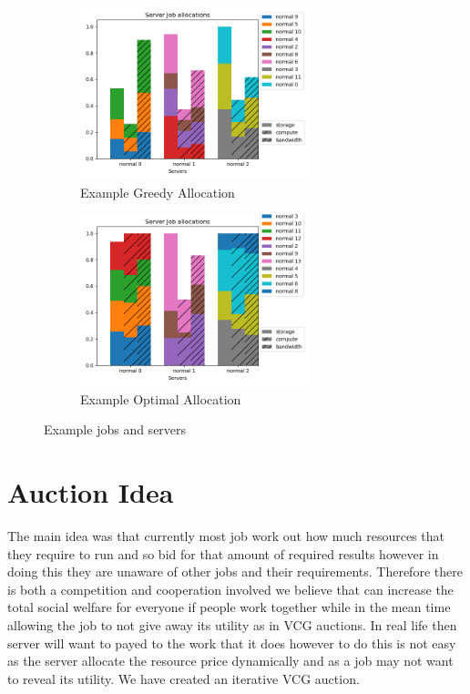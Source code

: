 \documentclass[fleqn]{article}
\begin{document}
\begin{figure}
    \begin{subfigure}{0.5\textwidth}
        \includegraphics[width=1\linewidth, height=5cm]{../results/greedy_allocation.png}
        \caption{Example Greedy Allocation}
    \end{subfigure}
    \begin{subfigure}{0.5\textwidth}
        \includegraphics[width=1\linewidth, height=5cm]{../results/optimal_allocation.png}
        \caption{Example Optimal Allocation}
    \end{subfigure}
    \caption{Example jobs and servers}
\end{figure}

\section{Auction Idea}\label{sec:auction-idea}
The main idea was that currently most job work out how much resources that they require to run and so bid for that amount of required results however in doing this they are unaware of other jobs and their requirements. Therefore there is both a competition and cooperation involved we believe that can increase the total social welfare for everyone if people work together while in the mean time allowing the job to not give away its utility as in VCG auctions.
In real life then server will want to payed to the work that it does however to do this is not easy as the server allocate the resource price dynamically and as a job may not want to reveal its utility.
We have created an iterative VCG auction.
\end{document}
